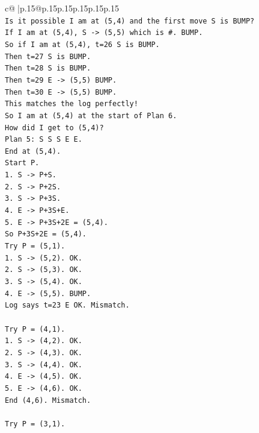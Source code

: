 \documentclass{article}
\begin{document}
{\begin{supertabular}{c@{$\;$}|p{.15\linewidth}@{}p{.15\linewidth}p{.15\linewidth}p{.15\linewidth}p{.15\linewidth}p{.15\linewidth}}
{{{\\ 
\texttt{Is it possible I am at (5,4) and the first move S is BUMP?} \\
\texttt{If I am at (5,4), S {-}> (5,5) which is \#. BUMP.} \\
\texttt{So if I am at (5,4), t=26 S is BUMP.} \\
\texttt{Then t=27 S is BUMP.} \\
\texttt{Then t=28 S is BUMP.} \\
\texttt{Then t=29 E {-}> (5,5) BUMP.} \\
\texttt{Then t=30 E {-}> (5,5) BUMP.} \\
\texttt{This matches the log perfectly!} \\
\texttt{So I am at (5,4) at the start of Plan 6.} \\
\texttt{How did I get to (5,4)?} \\
\texttt{Plan 5: S S S E E.} \\
\texttt{End at (5,4).} \\
\texttt{Start P.} \\
\texttt{1. S {-}> P+S.} \\
\texttt{2. S {-}> P+2S.} \\
\texttt{3. S {-}> P+3S.} \\
\texttt{4. E {-}> P+3S+E.} \\
\texttt{5. E {-}> P+3S+2E = (5,4).} \\
\texttt{So P+3S+2E = (5,4).} \\
\texttt{Try P = (5,1).} \\
\texttt{1. S {-}> (5,2). OK.} \\
\texttt{2. S {-}> (5,3). OK.} \\
\texttt{3. S {-}> (5,4). OK.} \\
\texttt{4. E {-}> (5,5). BUMP.} \\
\texttt{Log says t=23 E OK. Mismatch.} \\
\\ 
\texttt{Try P = (4,1).} \\
\texttt{1. S {-}> (4,2). OK.} \\
\texttt{2. S {-}> (4,3). OK.} \\
\texttt{3. S {-}> (4,4). OK.} \\
\texttt{4. E {-}> (4,5). OK.} \\
\texttt{5. E {-}> (4,6). OK.} \\
\texttt{End (4,6). Mismatch.} \\
\\ 
\texttt{Try P = (3,1).} \\
}}}
\end{supertabular}}
\end{document}
